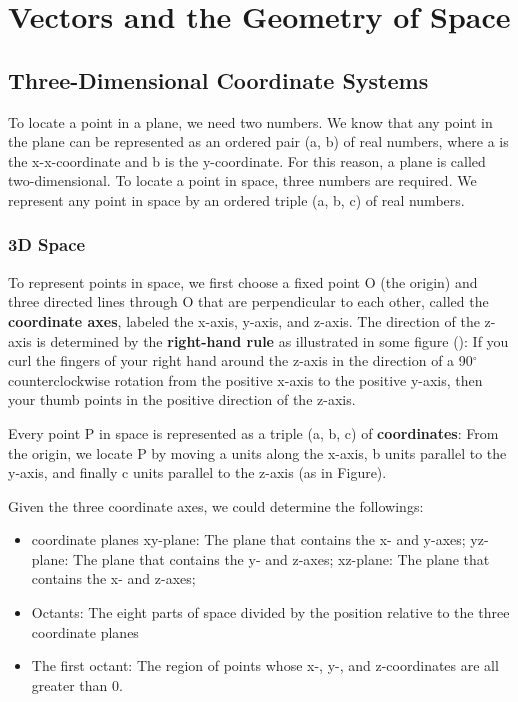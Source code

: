 \documentclass[../main.tex]{subfiles}
\begin{document}
\chapter{Vectors and the Geometry of Space}


\section{Three-Dimensional Coordinate Systems}

To locate a point in a plane, we need two numbers. We know that any point in the plane can be represented as an ordered pair (a, b) of real numbers, where a is the x-x-coordinate and b is the y-coordinate. For this reason, a plane is called two-dimensional. To locate a point in space, three numbers are required. We represent any point in space by an ordered triple (a, b, c) of real numbers.

\subsection{3D Space}

To represent points in space, we first choose a fixed point O (the origin) and three directed lines through O that are perpendicular to each other, called the \textbf{coordinate axes}, labeled the x-axis, y-axis, and z-axis. The direction of the z-axis is determined by the \textbf{right-hand rule} as illustrated in some figure (): If you curl the fingers of your right hand around the z-axis in the direction of a 90$^\circ$ counterclockwise rotation from the positive x-axis to the positive y-axis, then your thumb points in the positive direction of the z-axis.

Every point P in space is represented as a triple (a, b, c) of \textbf{coordinates}: From the origin, we locate P by moving a units along the x-axis, b units parallel to the y-axis, and finally c units parallel to the z-axis (as in Figure).

Given the three coordinate axes, we could determine the followings:

\begin{itemize}
    \item coordinate planes
        \subitem xy-plane: The plane that contains the x- and y-axes;
        \subitem yz-plane: The plane that contains the y- and z-axes;
        \subitem xz-plane: The plane that contains the x- and z-axes;
    \item Octants: The eight parts of space divided by the position relative to the three coordinate planes
        \item The first octant: The region of points whose x-, y-, and z-coordinates are all greater than 0.
\end{itemize}
\end{document}
